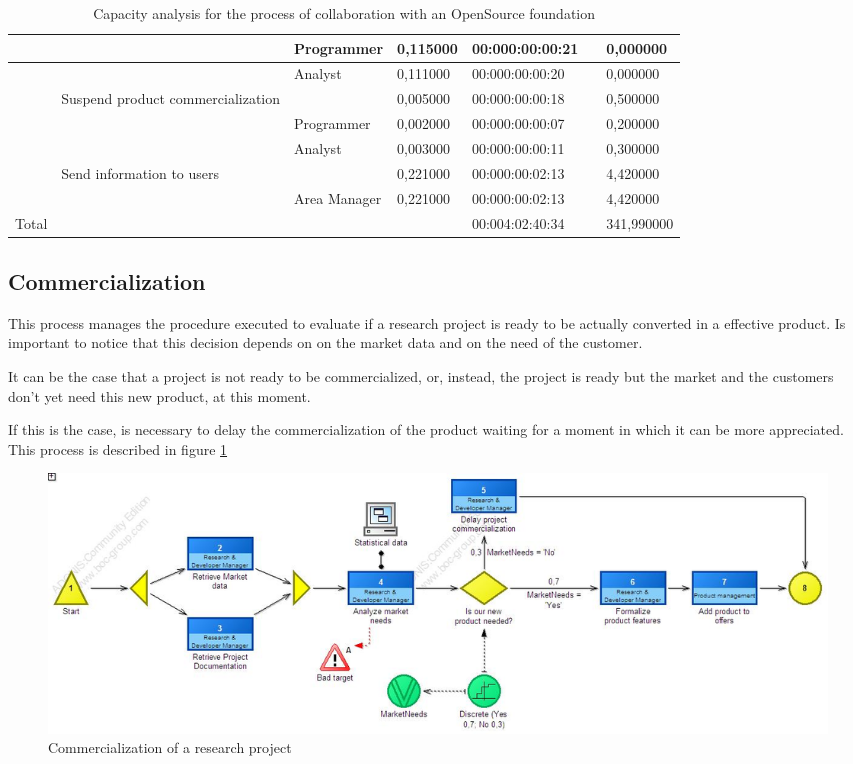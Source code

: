 \begin{landscape}
\begin{table}
{\begin{tabular}{|l|l|l|l|l|l|l|}
\hline
&&Programmer &0,115000&00:000:00:00:21&&0,000000\\
\hline
&&Analyst &0,111000&00:000:00:00:20&&0,000000\\
\hline
&Suspend product commercialization &&0,005000&00:000:00:00:18&&0,500000\\
\hline
&&Programmer &0,002000&00:000:00:00:07&&0,200000\\
\hline
&&Analyst &0,003000&00:000:00:00:11&&0,300000\\
\hline
&Send information to users &&0,221000&00:000:00:02:13&&4,420000\\
\hline
&&Area Manager &0,221000&00:000:00:02:13&&4,420000\\
\hline
Total&&&&00:004:02:40:34&&341,990000\\
\hline
\end{tabular}
}
\caption{Capacity analysis for the process of collaboration with an
OpenSource foundation} 
\label{2tab:coop}
\end{table}
\end{landscape}




\subsection{Commercialization}
This process manages the procedure executed to evaluate if a research
project is ready to be actually converted in a effective product.
Is important to notice that this decision depends on on the market data and
on the need of the customer.

It can be the case that a project is not ready to be commercialized, or,
instead, the project is ready but the market and the customers don't yet
need this new product, at this moment.

If this is the case, is necessary to delay the commercialization of the
product waiting for a moment in which it can be more appreciated.
This process is described in figure \ref{2img:commerce}

\begin{figure}[!ht]
\begin{centering}
\includegraphics[scale=0.45,angle=90]{assign2/adonis/imgs/commercialize.jpg}
\caption{Commercialization of a research project}
\label{2img:commerce}
\end{centering}
\end{figure}

